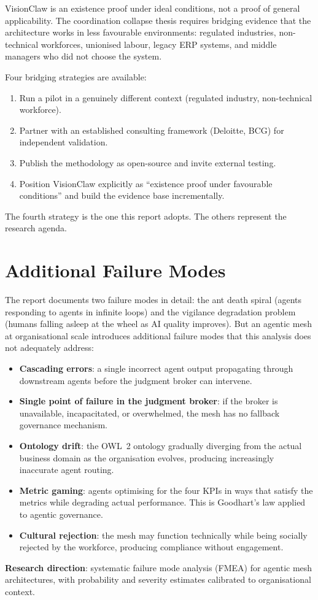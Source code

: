 \begin{keyinsight}
VisionClaw is an existence proof under ideal conditions, not a proof of general applicability. The coordination collapse thesis requires bridging evidence that the architecture works in less favourable environments: regulated industries, non-technical workforces, unionised labour, legacy ERP systems, and middle managers who did not choose the system.

Four bridging strategies are available:
\begin{enumerate}
  \item Run a pilot in a genuinely different context (regulated industry, non-technical workforce).
  \item Partner with an established consulting framework (Deloitte, BCG) for independent validation.
  \item Publish the methodology as open-source and invite external testing.
  \item Position VisionClaw explicitly as ``existence proof under favourable conditions'' and build the evidence base incrementally.
\end{enumerate}
The fourth strategy is the one this report adopts. The others represent the research agenda.
\end{keyinsight}

\section{Additional Failure Modes}

The report documents two failure modes in detail: the ant death spiral (agents responding to agents in infinite loops) and the vigilance degradation problem (humans falling asleep at the wheel as AI quality improves). But an agentic mesh at organisational scale introduces additional failure modes that this analysis does not adequately address:

\begin{itemize}
  \item \textbf{Cascading errors}: a single incorrect agent output propagating through downstream agents before the judgment broker can intervene.
  \item \textbf{Single point of failure in the judgment broker}: if the broker is unavailable, incapacitated, or overwhelmed, the mesh has no fallback governance mechanism.
  \item \textbf{Ontology drift}: the OWL~2 ontology gradually diverging from the actual business domain as the organisation evolves, producing increasingly inaccurate agent routing.
  \item \textbf{Metric gaming}: agents optimising for the four KPIs in ways that satisfy the metrics while degrading actual performance. This is Goodhart's law applied to agentic governance.
  \item \textbf{Cultural rejection}: the mesh may function technically while being socially rejected by the workforce, producing compliance without engagement.
\end{itemize}

\textbf{Research direction}: systematic failure mode analysis (FMEA) for agentic mesh architectures, with probability and severity estimates calibrated to organisational context.
